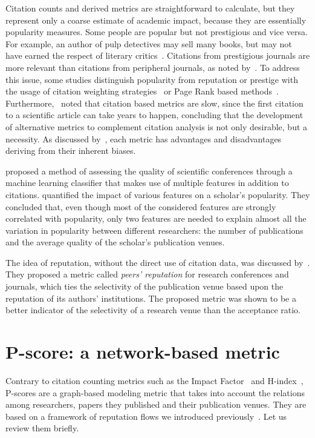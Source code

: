 \documentclass[man]{apa6}
\let \citeA \textcite
\let \cite \parencite
\begin{document}
Citation counts and derived metrics are straightforward to calculate, but they represent only a coarse
estimate of academic impact, because they are essentially popularity measures. Some people are popular but not 
prestigious and vice versa. For example, an author of pulp detectives may sell many books, but may not have earned 
the respect of literary critics~\cite{Bollen2006}. Citations from 
prestigious journals are more relevant than citations from peripheral journals, as noted by~\citeA{Pinski1976}. To address this issue, some studies distinguish popularity from 
reputation or prestige with the usage of citation weighting strategies~\cite{Ding2011, Yan2011a} or 
Page Rank based methods~\cite{Bollen2006, Sun2007}. 
Furthermore,~\citeA{Piwowar2013} noted that citation based metrics are slow, since the 
first citation to a scientific article can take years to happen, concluding that the development of 
alternative metrics to complement citation analysis is not only desirable, but a necessity.
As discussed by~\citeA{Leydesdorff2009}, each metric has advantages and disadvantages deriving from their 
inherent biases.

\citeA{Martins2009} proposed a method of assessing the quality of scientific conferences 
through a machine learning classifier that makes use of multiple features in addition to citations.
\citeA{Goncalves2014} quantified the impact of various features on a 
scholar's popularity. They concluded that, even though most of the considered features are strongly correlated 
with popularity, only two features are needed to explain almost all the variation in popularity between different 
researchers: the number of publications and the average quality of the scholar’s publication venues. 

The idea of reputation, without the direct use of citation data, was discussed by~\citeA{Nelakuditi2011}. They proposed a metric called \textit{peers' reputation} for 
research conferences and journals, which ties the selectivity of the publication venue based upon 
the reputation of its authors' institutions. The proposed metric was shown to be a better indicator 
of the selectivity of a research venue than the acceptance ratio.

\section{P-score: a network-based metric} 
\label{pscore} 

Contrary to citation counting metrics such as the Impact 
Factor~\cite{Garfield1955a, Saha2003, Thomson2017, Balaban2012} and 
H-index~\cite{Benevenuto2016, Bar-Ilan2008, Egghe2008, Bornmann2005, Bornmann2011}, 
P-scores are a graph-based modeling metric that takes into account 
the relations among researchers, papers they published and their publication venues. They are 
based on a framework of reputation flows we introduced previously~\cite{Ribas2015}. Let us review 
them briefly. 
\end{document}
